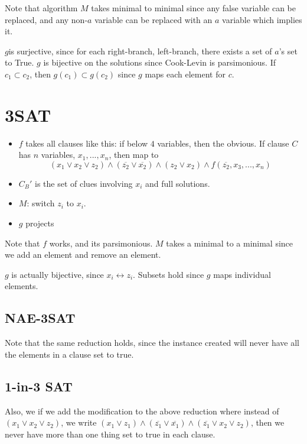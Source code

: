 \documentclass[runningheads,a4paper]{llncs}
\begin{document}
Note that algorithm $M$ takes minimal to minimal since any false variable can be replaced, and any non-$a$ variable can be replaced with an $a$ variable which implies it. 

$g$is surjective, since for each right-branch, left-branch, there exists a set of $a$'s set to True. $g$ is bijective on the solutions since Cook-Levin is parsimonious. If $c_1 \subset c_2$, then $g(c_1) \subset g(c_2)$ since $g$ maps each element for $c$.

\section{3SAT}

\begin{itemize}
\item $f$ takes all clauses like this: if below $4$ variables, then the obvious. If clause $C$ has $n$ variables, $x_1, ..., x_n$, then map to
\[ (x_1 \vee x_2 \vee z_2) \wedge (\overline{z_2} \vee \overline{x_2}) \wedge (z_2 \vee x_2) \wedge f(\overline{z_2}, x_3, ..., x_n) \]
\item $C_B'$ is the set of clues involving $x_i$ and full solutions.
\item $M$: switch $z_i$ to $x_i$.
\item $g$ projects
\end{itemize}

Note that $f$ works, and its parsimonious. $M$ takes a minimal to a minimal since we add an element and remove an element. 

$g$ is actually bijective, since $x_i \leftrightarrow z_i$. Subsets hold since $g$ maps individual elements.

\subsection{NAE-3SAT}

Note that the same reduction holds, since the instance created will never have all the elements in a clause set to true. 

\subsection{1-in-3 SAT}

Also, we if we add the modification to the above reduction where instead of $(x_1 \vee x_2 \vee z_2)$, we write $(x_1 \vee z_1) \wedge (\overline{z_1} \vee \overline{x_1}) \wedge (\overline{z_1} \vee x_2 \vee z_2)$, then we never have more than one thing set to true in each clause. 
\end{document}
